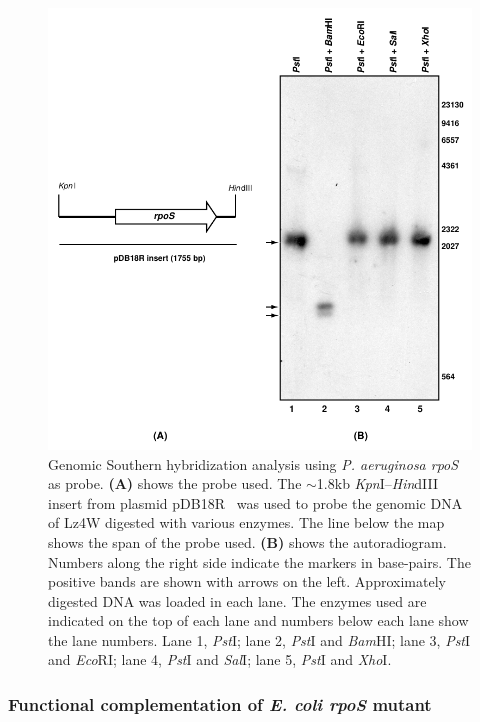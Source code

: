 \begin{figure}[tbp]
\includegraphics{figures/chap3_pdb18r_southern}
\caption[Genomic Southern blot analysis using \emph{P. aeruginosa
rpoS} as probe]{%
    Genomic Southern hybridization analysis using \emph{P. aeruginosa rpoS}
    as probe. \textbf{(A)} shows the probe used. The \U{$\sim$1.8}{kb} \emph{Kpn}I--\emph{Hin}dIII insert from
    plasmid pDB18R~\citep{Fujita1994} was used to probe the genomic DNA of Lz4W digested with various enzymes.
    The line below the map shows the span of the probe used. \textbf{(B)} shows the autoradiogram. Numbers along the right side
indicate the markers in base-pairs. The positive bands are shown
with arrows on the left. Approximately  digested DNA was
loaded in each lane. The enzymes used are indicated on the top of
each lane and numbers below each lane show the lane numbers. Lane
1, \emph{Pst}I; lane 2, \emph{Pst}I and \emph{Bam}HI; lane 3,
\emph{Pst}I and \emph{Eco}RI; lane 4, \emph{Pst}I and \emph{Sal}I;
lane 5, \emph{Pst}I and \emph{Xho}I.}
\label{chap3:pdb18r_southern}
\end{figure}

\subsubsection{Functional complementation of \emph{E. coli rpoS}
mutant}

